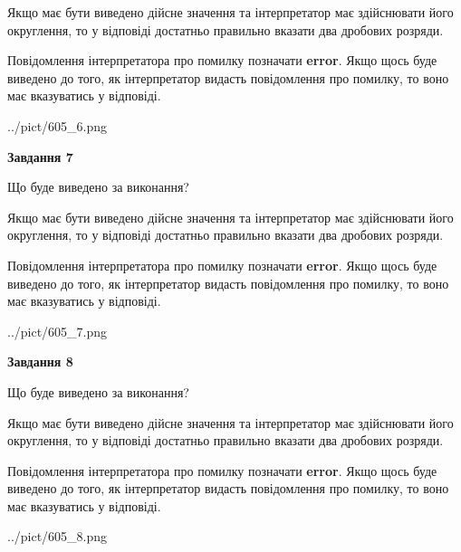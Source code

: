 \documentclass[12pt, ukrainian]{article}
\begin{document}
{\begin {Large}
Якщо має бути виведено дійсне значення та інтерпретатор має здійснювати його округлення, 
то у відповіді достатньо правильно вказати два дробових розряди.

Повідомлення інтерпретатора про помилку позначати \textbf{error}.
Якщо щось буде виведено до того, як інтерпретатор видасть повідомлення про помилку, 
то воно має вказуватись у відповіді. \par

\begin{center}
	{../pict/605_6.png}
\end{center}
\newpage

{\begin {center}\textbf{Завдання 7}\end {center}}\par
Що буде виведено за виконання? \par

Якщо має бути виведено дійсне значення та інтерпретатор має здійснювати його округлення, 
то у відповіді достатньо правильно вказати два дробових розряди.

Повідомлення інтерпретатора про помилку позначати \textbf{error}.
Якщо щось буде виведено до того, як інтерпретатор видасть повідомлення про помилку, 
то воно має вказуватись у відповіді. \par

\begin{center}
	{../pict/605_7.png}
\end{center}
\newpage

{\begin {center}\textbf{Завдання 8}\end {center}}\par
Що буде виведено за виконання? \par

Якщо має бути виведено дійсне значення та інтерпретатор має здійснювати його округлення, 
то у відповіді достатньо правильно вказати два дробових розряди.

Повідомлення інтерпретатора про помилку позначати \textbf{error}.
Якщо щось буде виведено до того, як інтерпретатор видасть повідомлення про помилку, 
то воно має вказуватись у відповіді. \par

\begin{center}
	{../pict/605_8.png}
\end{center}
\newpage


\end{Large}}
\end{document}
